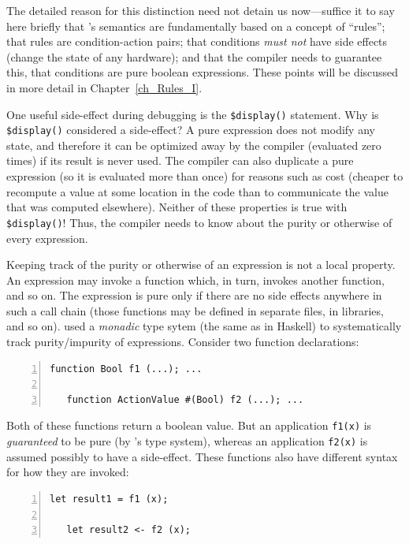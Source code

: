 The detailed reason for this distinction need not detain us
now---suffice it to say here briefly that {\BSV}'s semantics are
fundamentally based on a concept of ``rules''; that rules are
condition-action pairs; that conditions \emph{must not} have side
effects (change the state of any hardware); and that the compiler
needs to guarantee this, {\ie} that conditions are pure boolean
expressions.  These points will be discussed in more detail in
Chapter~\ref{ch_Rules_I}.

One useful side-effect during debugging is the {\tt \$display()}
statement.  Why is {\tt \$display()} considered a side-effect?  A pure
expression does not modify any state, and therefore it can be
optimized away by the compiler (evaluated zero times) if its result is
never used.  The compiler can also duplicate a pure expression (so it
is evaluated more than once) for reasons such as cost (cheaper to
recompute a value at some location in the code than to communicate the
value that was computed elsewhere).  Neither of these properties is
true with {\tt \$display()}!  Thus, the compiler needs to know about
the purity or otherwise of every expression.

Keeping track of the purity or otherwise of an expression is not a
local property.  An expression may invoke a function which, in turn,
invokes another function, and so on.  The expression is pure only if
there are no side effects anywhere in such a call chain (those
functions may be defined in separate files, in libraries, and so on).
{\BSV} used a \emph{monadic} type sytem (the same as in Haskell) to
systematically track purity/impurity of expressions.  Consider two
function declarations:


{\footnotesize
\begin{Verbatim}[frame=single, numbers=left]
   function Bool f1 (...); ...

   function ActionValue #(Bool) f2 (...); ...
\end{Verbatim}
}

Both of these functions return a boolean value.  But an application
{\tt f1(x)} is \emph{guaranteed} to be pure (by {\BSV}'s type system),
whereas an application {\tt f2(x)} is assumed possibly to have a
side-effect.  These functions also have different syntax for how they
are invoked:

{\footnotesize
\begin{Verbatim}[frame=single, numbers=left]
   let result1 = f1 (x);

   let result2 <- f2 (x);
\end{Verbatim}
}

